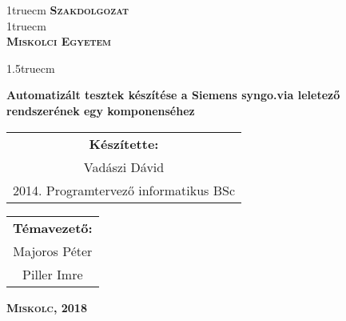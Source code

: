 \pagestyle{empty} %

{\large
\begin{center}
\vglue 1truecm
\textbf{\huge\textsc{Szakdolgozat}}\\
\vglue 1truecm
\\
\textbf{\textsc{Miskolci Egyetem}}
\end{center}}

\vglue 1.5truecm %

{\LARGE
\begin{center}
\textbf{Automatizált tesztek készítése a Siemens syngo.via leletező rendszerének egy komponenséhez}
\end{center}}

\vspace*{2.5truecm}
{\large
\begin{center}
\begin{tabular}{c}
\textbf{Készítette:}\\
Vadászi Dávid\\
2014. Programtervező informatikus BSc
\end{tabular}
\end{center}
\begin{center}
\begin{tabular}{c}
\textbf{Témavezető:}\\
Majoros Péter\\
Piller Imre
\end{tabular}
\end{center}}
\vfill
{\large
\begin{center}
\textbf{\textsc{Miskolc, 2018}}
\end{center}}

\newpage
